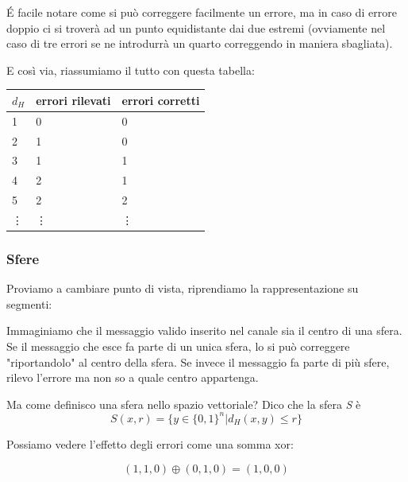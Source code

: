 \'E facile notare come si può correggere facilmente un errore, ma in caso di errore doppio ci si troverà ad un punto equidistante dai due estremi (ovviamente nel caso di tre errori se ne introdurrà un quarto correggendo in maniera sbagliata).

E così via, riassumiamo il tutto con questa tabella:

\begin{table}[h]
	\centering
	\begin{tabular}{l|l|l}
		$d_H$ & errori rilevati & errori corretti \\
		\hline
		1     & 0               & 0               \\
		2     & 1               & 0               \\
		3     & 1               & 1               \\
		4     & 2               & 1               \\
		5     & 2               & 2              \\
		\vdots & \vdots & \vdots
	\end{tabular}
\end{table}

\newpage

\subsubsection*{Sfere}
Proviamo a cambiare punto di vista, riprendiamo la rappresentazione su segmenti:


Immaginiamo che il messaggio valido inserito nel canale sia il centro di una sfera.
Se il messaggio che esce fa parte di un unica sfera, lo si può correggere "riportandolo" al centro della sfera. Se invece il messaggio fa parte di più sfere, rilevo l'errore ma non so a quale centro appartenga.


Ma come definisco una sfera nello spazio vettoriale? Dico che la sfera \textit{S} è
\begin{equation}
S(x,r) = \{y \in \{0,1\}^n | d_H(x,y) \leq r \}
\end{equation}

Possiamo vedere l'effetto degli errori come una somma xor:

\begin{equation*}
(1,1,0) \oplus (0,1,0) = (1,0,0)
\end{equation*}

